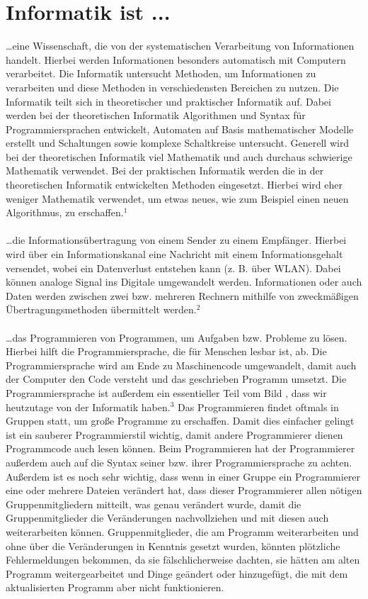 \documentclass[12pt]{scrartcl}
\begin{document}
\section*{Informatik ist ...}
\onehalfspacing
	…eine Wissenschaft, die von der systematischen Verarbeitung von Informationen handelt. Hierbei werden Informationen besonders automatisch mit Computern verarbeitet. Die Informatik untersucht Methoden, um Informationen zu verarbeiten und diese Methoden in verschiedensten Bereichen zu nutzen. Die Informatik teilt sich in theoretischer und praktischer Informatik auf. Dabei werden bei der theoretischen Informatik Algorithmen und Syntax für Programmiersprachen entwickelt, Automaten auf Basis mathematischer Modelle erstellt und Schaltungen sowie komplexe Schaltkreise untersucht. Generell wird bei der theoretischen Informatik viel Mathematik und auch durchaus schwierige Mathematik verwendet. Bei der praktischen Informatik werden die in der theoretischen Informatik entwickelten Methoden eingesetzt. Hierbei wird eher weniger Mathematik verwendet, um etwas neues, wie zum Beispiel einen neuen Algorithmus, zu erschaffen.$^1$
	\\ \\
	…die Informationsübertragung von einem Sender zu einem Empfänger. Hierbei wird über ein Informationskanal eine Nachricht mit einem Informationsgehalt versendet, wobei ein Datenverlust entstehen kann (z. B. über WLAN). Dabei können analoge Signal ins Digitale umgewandelt werden. Informationen oder auch Daten werden zwischen zwei bzw. mehreren Rechnern mithilfe von zweckmäßigen Übertragungsmethoden übermittelt werden.$^2$
	\\ \\
	…das Programmieren von Programmen, um Aufgaben bzw. Probleme zu lösen. Hierbei hilft die Programmiersprache, die für Menschen lesbar ist, ab. Die Programmiersprache wird am Ende zu Maschinencode umgewandelt, damit auch der Computer den Code versteht und das geschrieben Programm umsetzt. Die Programmiersprache ist außerdem ein essentieller Teil vom Bild , dass wir heutzutage von der Informatik haben.$^3$ Das Programmieren findet oftmals in Gruppen statt, um große Programme zu erschaffen. Damit dies einfacher gelingt ist ein sauberer Programmierstil wichtig, damit andere Programmierer dienen Programmcode auch lesen können. Beim Programmieren hat der Programmierer außerdem auch auf die Syntax seiner bzw. ihrer Programmiersprache zu achten. Außerdem ist es noch sehr wichtig, dass wenn in einer Gruppe ein Programmierer eine oder mehrere Dateien verändert hat, dass dieser Programmierer allen nötigen Gruppenmitgliedern mitteilt, was genau verändert wurde, damit die Gruppenmitglieder die Veränderungen nachvollziehen und mit diesen auch weiterarbeiten können. Gruppenmitglieder, die am Programm weiterarbeiten und ohne über die Veränderungen in Kenntnis gesetzt wurden, könnten plötzliche Fehlermeldungen bekommen, da sie fälschlicherweise dachten, sie hätten am alten Programm weitergearbeitet und Dinge geändert oder hinzugefügt, die mit dem aktualisierten Programm aber nicht funktionieren.
\end{document}

